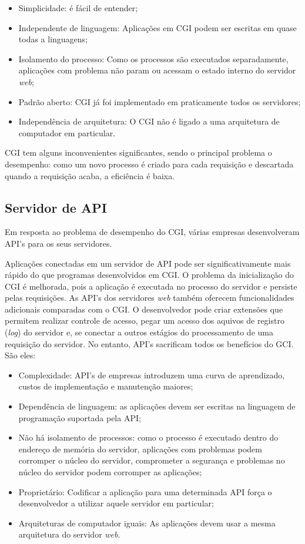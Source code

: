 \begin{itemize}
	\item Simplicidade: é fácil de entender;
	\item Independente de linguagem: Aplicações em CGI podem ser escritas em quase todas a linguagens;
	\item Isolamento do processo: Como os processos são executados 
	separadamente, aplicações com problema não param ou acessam o estado 
	interno do servidor \textit{web};
	\item Padrão aberto: CGI já foi implementado em praticamente todos os 
	servidores;
	\item Independência de arquitetura: O CGI não é ligado a uma arquitetura de computador em particular.
\end{itemize}

CGI tem alguns inconvenientes significantes, sendo o principal problema  o 
desempenho: como um novo processo é criado para cada requisição e descartada 
quando a requisição acaba, a eficiência é baixa.

\subsection{Servidor de API}

Em resposta ao problema de desempenho do CGI, várias empresas desenvolveram 
API's para os seus servidores.

Aplicações conectadas em um servidor de API pode ser significativamente mais 
rápido do que programas desenvolvidos em CGI. O problema da inicialização do 
CGI é melhorada, pois a aplicação é executada no processo do servidor e 
persiste pelas requisições. As API's dos servidores \textit{web} também 
oferecem funcionalidades adicionais comparadas com o CGI. O desenvolvedor pode 
criar extensões que permitem realizar controle de acesso, pegar um acesso dos 
aquivos de registro (\textit{log}) do servidor e, se conectar a outros estágios 
do processamento de uma requisição do servidor. No entanto, API's sacrificam 
todos os benefícios do GCI. São eles:

\begin{itemize}
	\item Complexidade: API's de empresas introduzem uma curva de aprendizado, 
	custos de implementação e manutenção maiores;
	\item Dependência de linguagem: as aplicações devem ser escritas na 
	linguagem de programação suportada pela API;
	\item Não há isolamento de processos: como o processo é executado dentro do 
	endereço de memória do servidor, aplicações com problemas podem corromper o 
	núcleo do servidor, comprometer a segurança e problemas no núcleo do 
	servidor podem corromper as aplicações;
	\item Proprietário: Codificar a aplicação para uma determinada API força o desenvolvedor a utilizar aquele servidor em particular;
	\item Arquiteturas de computador iguais: As aplicações devem usar a mesma 
	arquitetura do servidor \textit{web}.
\end{itemize}


